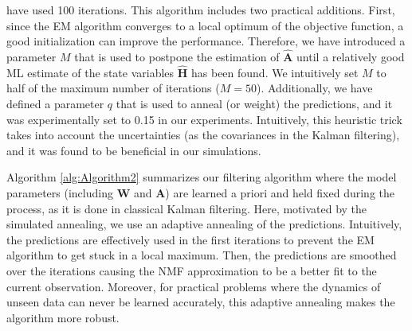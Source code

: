 \documentclass[10pt,twocolumn,twoside] {IEEEtran}
\begin{document}
have used 100 iterations. This algorithm includes two practical
additions. First, since the EM algorithm converges to a local optimum of the
objective function, a good initialization can improve the performance.
Therefore, we have introduced a parameter $M$ that is used to postpone the
estimation of $\hat{\mathbf{A}}$ until a relatively good ML estimate
of the state variables $\hat{\mathbf{H}}$  has been found. We intuitively set $M$ to half of the maximum number of iterations ($M=50$).
Additionally, we have defined a parameter $q$ that is used to anneal (or weight) the predictions, and it was experimentally set to 0.15 in our experiments. Intuitively, this heuristic trick takes into account the uncertainties
(as the covariances in the Kalman filtering), and it was found to be beneficial in our simulations.

Algorithm \ref{alg:Algorithm2} summarizes our filtering algorithm where the model parameters
(including $\mathbf{W}$ and $\mathbf{A}$) are learned a priori and
held fixed during the process, as it is done in classical Kalman
filtering. Here, motivated by the simulated annealing, we use an adaptive annealing of the predictions. Intuitively, the predictions are effectively used in the first iterations to prevent the EM algorithm to get stuck in a local maximum. Then, the predictions are smoothed over the iterations causing the NMF approximation to be a better fit
to the current observation.
Moreover, for practical problems where the dynamics of
unseen data can never be learned accurately, this adaptive annealing
makes the algorithm more robust.
\end{document}
